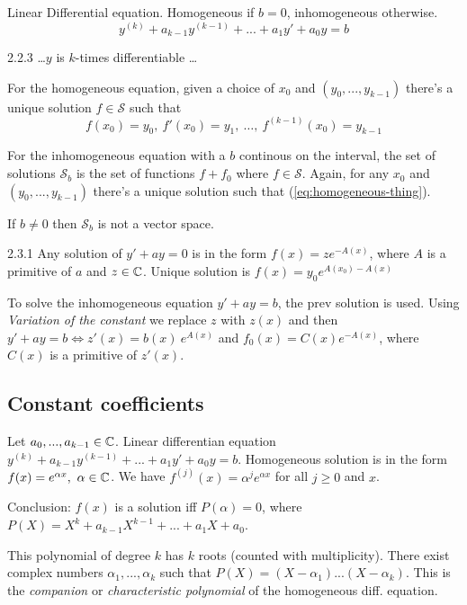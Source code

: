 \begin{definition}
    Linear Differential equation. Homogeneous if  $b = 0$, inhomogeneous otherwise.
    \[ y^{(k)} + a_{k-1} y^{(k-1)} + ... + a_1 y' + a_0 y = b \]
\end{definition}

\begin{theorem}{2.2.3}
    \dots $y$ is $k$-times differentiable \dots

    For the homogeneous equation, given a choice of $x_0$ and $(y_0, ..., y_{k-1})$
    there's a unique solution $f \in \mathcal{S}$ such that
    \begin{equation}\label{eq:homogeneous-thing} f(x_0) = y_0,\ f'(x_0) = y_1,\ \dots,\ f^{(k-1)}(x_0) = y_{k-1}  \end{equation}

    For the inhomogeneous equation with a $b$ continous on the interval, the set of solutions $\mathcal{S}_b$
    is the set of functions $f + f_0$ where $f \in \mathcal{S}$. Again, for any $x_0$ and $(y_0, ..., y_{k-1})$
    there's a unique solution such that (\eqref{eq:homogeneous-thing}).

    If $b \ne 0$ then $\mathcal{S}_b$ is not a vector space.
\end{theorem}

\begin{proposition}{2.3.1}
    Any solution of $y' + ay = 0$ is in the form $f(x) = z e^{-A(x)}$, where $A$ is a primitive of $a$ and $z \in \mathbb{C}$.
    Unique solution is $f(x) = y_0 e^{A(x_0) - A(x)}$
\end{proposition}

To solve the inhomogeneous equation $y' + ay = b$, the prev solution is used.
Using \textit{Variation of the constant} we replace $z$ with $z(x)$ and then
$y' + ay = b \Leftrightarrow z'(x) = b(x)\ e^{A(x)}$ and $f_0(x) = C(x) e^{-A(x)}$, where
$C(x)$ is a primitive of $z'(x)$.

\subsection{Constant coefficients}
\begin{definition}
    Let $a_0, ..., a_{k-1} \in \mathbb{C}$. Linear differentian equation $y^{(k)} + a_{k-1}y^{(k-1)} + ... + a_1y' + a_0y = b$.
    Homogeneous solution is in the form $f(x) = e^{\alpha x},\ \alpha \in \mathbb{C}$. We have $f^{(j)}(x) = \alpha^j e^{\alpha x}$ for all $j \ge 0$ and $x$.

    Conclusion: $f(x)$ is a solution iff $P(\alpha) = 0$, where $P(X) = X^k + a_{k-1}X^{k-1} + ... + a_1X + a_0$.

    This polynomial of degree $k$ has $k$ roots (counted with multiplicity). There exist complex numbers $\alpha_1, ..., \alpha_k$
    such that $P(X) = (X - \alpha_1)...(X - \alpha_k)$. This is the \textit{companion} or \textit{characteristic polynomial} of the
    homogeneous diff. equation.
\end{definition}

